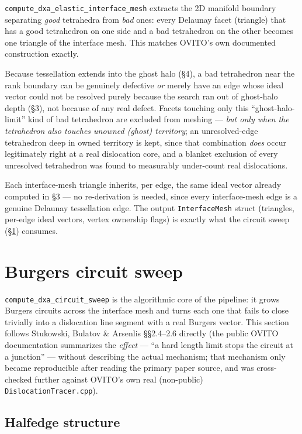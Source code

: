 \documentclass[11pt,a4paper]{article}
\newcommand{\op}[1]{\texttt{#1}}
\newcommand{\code}[1]{\texttt{#1}}
\begin{document}
\op{compute\_dxa\_elastic\_interface\_mesh} extracts the 2D manifold boundary separating \emph{good}
tetrahedra from \emph{bad} ones: every Delaunay facet (triangle) that has a good tetrahedron on one
side and a bad tetrahedron on the other becomes one triangle of the interface mesh. This matches
OVITO's own documented construction exactly.

Because tessellation extends into the ghost halo (\S 4), a bad tetrahedron near the rank boundary
can be genuinely defective \emph{or} merely have an edge whose ideal vector could not be resolved
purely because the search ran out of ghost-halo depth (\S 3), not because of any real defect. Facets
touching only this ``ghost-halo-limit'' kind of bad tetrahedron are excluded from meshing —
\emph{but only when the tetrahedron also touches unowned (ghost) territory}; an unresolved-edge
tetrahedron deep in owned territory is kept, since that combination \emph{does} occur legitimately
right at a real dislocation core, and a blanket exclusion of every unresolved tetrahedron was found
to measurably under-count real dislocations.

Each interface-mesh triangle inherits, per edge, the same ideal vector already computed in \S 3 —
no re-derivation is needed, since every interface-mesh edge is a genuine Delaunay tessellation edge.
The output \code{InterfaceMesh} struct (triangles, per-edge ideal vectors, vertex ownership flags)
is exactly what the circuit sweep (\S\ref{sec:sweep}) consumes.

\section{Burgers circuit sweep}
\label{sec:sweep}

\op{compute\_dxa\_circuit\_sweep} is the algorithmic core of the pipeline: it grows Burgers circuits
across the interface mesh and turns each one that fails to close trivially into a dislocation
line segment with a real Burgers vector. This section follows Stukowski, Bulatov \& Arsenlis
\S\S2.4--2.6 \cite{stukowski2012} directly (the public OVITO documentation summarizes the
\emph{effect} — ``a hard length limit stops the circuit at a junction'' — without describing the
actual mechanism; that mechanism only became reproducible after reading the primary paper source,
and was cross-checked further against OVITO's own real (non-public) \code{DislocationTracer.cpp}).

\subsection{Halfedge structure}
\end{document}
